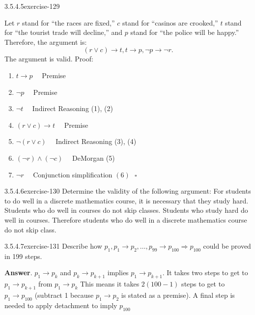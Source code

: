 \documentclass[twoside,10pt,]{book}
\numberwithin{equation}{section}
\begin{document}
\begin{divisionsolution}{3.5.4.5}{}{exercise-129}
\begin{enumerate}[label=(\alph*)]
Let \(r\) stand for ``the races are fixed,'' \(c\) stand for ``casinos are crooked,'' \(t\) stand for ``the tourist trade will decline,'' and \(p\) stand for ``the police will be happy.'' Therefore, the argument is:%
\begin{equation*}
(r\lor c)\to t, t\to p, \neg p\to \neg r\text{.}
\end{equation*}
The argument is valid. Proof:%
\par
\hypertarget{p-1229}{}%
%
\begin{enumerate}[label=(\arabic*)]
\item\hypertarget{li-701}{}\hypertarget{p-1230}{}%
\(t\to p\quad \)   Premise%
\item\hypertarget{li-702}{}\hypertarget{p-1231}{}%
\(\neg p\quad \)   Premise%
\item\hypertarget{li-703}{}\hypertarget{p-1232}{}%
\(\neg t\quad \)   Indirect Reasoning (1), (2)%
\item\hypertarget{li-704}{}\hypertarget{p-1233}{}%
\((r\lor c)\to t\quad \)     Premise%
\item\hypertarget{li-705}{}\hypertarget{p-1234}{}%
\(\neg (r\lor c)\quad \)   Indirect Reasoning (3), (4)%
\item\hypertarget{li-706}{}\hypertarget{p-1235}{}%
\((\neg r)\land (\neg c)\quad \)   DeMorgan (5)%
\item\hypertarget{li-707}{}\hypertarget{p-1236}{}%
\(\neg r\quad \)     Conjunction simplification \((6)\text{    }\square\)%
\end{enumerate}
%
\end{enumerate}
%
\end{divisionsolution}%
\begin{divisionsolution}{3.5.4.6}{}{exercise-130}%
\hypertarget{p-1237}{}%
Determine the validity of the following argument: For students to do well in a discrete mathematics course, it is necessary that they study hard. Students who do well in courses do not skip classes. Students who study hard do well in courses. Therefore students who do well in a discrete mathematics course do not skip class.%
\end{divisionsolution}%
\begin{divisionsolution}{3.5.4.7}{}{exercise-131}%
\hypertarget{p-1238}{}%
Describe how \(p_1,p_1\to p_2,\ldots  ,p_{99}\to p_{100}\Rightarrow p_{100}\) could be proved in 199 steps.%
\par\smallskip%
\noindent\textbf{Answer}.\quad%
\hypertarget{p-1239}{}%
\(p_1\to p_k\) and \(p_k\to p_{k+1}\) implies \(p_1\to p_{k+1}\). It takes two steps to get to \(p_1\to p_{k+1}\) from \(p_1\to p_k\) This means it takes \(2(100-1)\) steps to get to \(p_1\to p_{100}\) (subtract 1 because \(p_1\to p_2\) is stated as a premise). A final step is needed to apply detachment to imply \(p_{100}\)%
\end{divisionsolution}%
\end{document}
